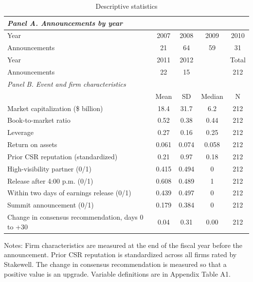 \documentclass[11pt]{article}
\begin{document}
\begin{table}[h!]
\centering
\begin{threeparttable}
\caption{Descriptive statistics}
\small
\begin{tabular}{lcccc}
\toprule
\multicolumn{5}{l}{\textit{Panel A. Announcements by year}} \\
\midrule
Year & 2007 & 2008 & 2009 & 2010 \\
Announcements & 21 & 64 & 59 & 31 \\
\addlinespace
Year & 2011 & 2012 & & Total \\
Announcements & 22 & 15 & & 212 \\
\midrule
\multicolumn{5}{l}{\textit{Panel B. Event and firm characteristics}} \\
\midrule
 & Mean & SD & Median & N \\
\midrule
Market capitalization (\$ billion) & 18.4 & 31.7 & 6.2 & 212 \\
Book-to-market ratio & 0.52 & 0.38 & 0.44 & 212 \\
Leverage & 0.27 & 0.16 & 0.25 & 212 \\
Return on assets & 0.061 & 0.074 & 0.058 & 212 \\
Prior CSR reputation (standardized) & 0.21 & 0.97 & 0.18 & 212 \\
High-visibility partner (0/1) & 0.415 & 0.494 & 0 & 212 \\
Release after 4:00 p.m. (0/1) & 0.608 & 0.489 & 1 & 212 \\
Within two days of earnings release (0/1) & 0.439 & 0.497 & 0 & 212 \\
Summit announcement (0/1) & 0.179 & 0.384 & 0 & 212 \\
Change in consensus recommendation, days 0 to +30 & 0.04 & 0.31 & 0.00 & 212 \\
\bottomrule
\end{tabular}
\begin{tablenotes}\footnotesize
\item Notes: Firm characteristics are measured at the end of the fiscal year before the announcement. Prior CSR reputation is standardized across all firms rated by Stakewell. The change in consensus recommendation is measured so that a positive value is an upgrade. Variable definitions are in Appendix Table A1.
\end{tablenotes}
\end{threeparttable}
\end{table}
\end{document}
